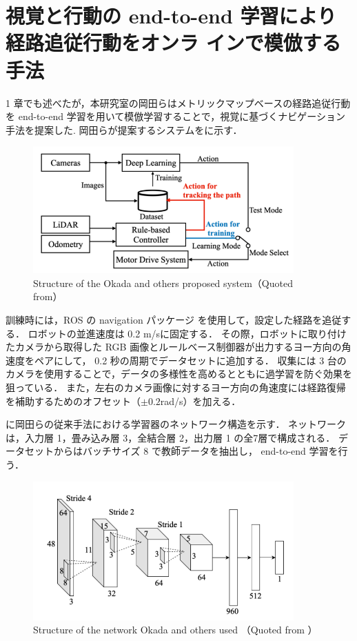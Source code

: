 \section{視覚と行動の end-to-end 学習により経路追従行動をオンラ
インで模倣する手法}
1 章でも述べたが，本研究室の岡田ら\cite{okada2020}はメトリックマップベースの経路追従行動を end-to-end 学習を用いて模倣学習することで，視覚に基づくナビゲーション手法を提案した.
岡田らが提案するシステムをに示す．

\begin{figure}[htbp]
  \centering
   \includegraphics[width=100mm]{images/pdf/okada/method_sys.pdf}
   \caption[Structure of the Okada and others proposed system]{Structure of the Okada and others proposed system（Quoted from\cite{okada2020}）}
   \label{fig:okada_sys}
\end{figure}

訓練時には，ROS の navigation パッケージ \cite{ros}を使用して，設定した経路を追従する．
ロボットの並進速度は 0.2 m/sに固定する．
その際，ロボットに取り付けたカメラから取得した RGB 画像とルールベース制御器が出力するヨー方向の角速度をペアにして， 0.2 秒の周期でデータセットに追加する．
収集には 3 台のカメラを使用することで，データの多様性を高めるとともに過学習を防ぐ効果を狙っている．
また，左右のカメラ画像に対するヨー方向の角速度には経路復帰を補助するためのオフセット（\(\pm 0.2\)rad/s）を加える．

\newpage
{}に岡田らの従来手法における学習器のネットワーク構造を示す．
ネットワークは，入力層 1，畳み込み層 3，全結合層 2，出力層 1 の全7層で構成される．
データセットからはバッチサイズ 8 で教師データを抽出し， end-to-end 学習を行う．

\begin{figure}[htbp]
    \centering
     \includegraphics[width=100mm]{images/pdf/okada/network.pdf}
     \caption[Structure of the network Okada and others used]{Structure of the network Okada and others used （Quoted from \cite{okada2020}）}
     \label{fig:okada_net}
\end{figure}

